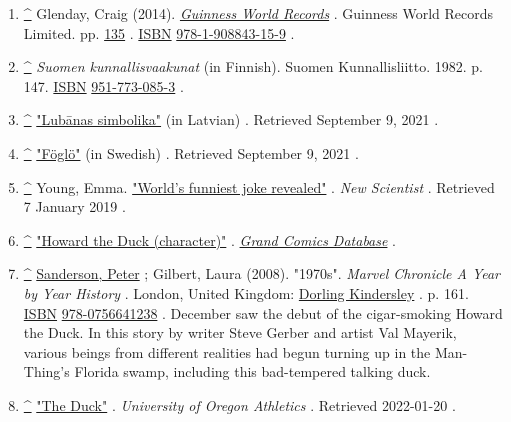 \documentclass[11pt,a4paper]{article}
\begin{document}
\begin{enumerate}
\item \href{\#cite\_ref-48}{\textbf{\textasciicircum{}}} Glenday, Craig (2014). \href{https://archive.org/details/guinnessworldrec0000unse\_r3e7/page/135}{\textit{Guinness World Records}} . Guinness World Records Limited. pp. \href{https://archive.org/details/guinnessworldrec0000unse\_r3e7/page/135}{135} . \href{/wiki/ISBN\_(identifier)}{ISBN} \href{/wiki/Special:BookSources/978-1-908843-15-9}{978-1-908843-15-9} .
\item \href{\#cite\_ref-49}{\textbf{\textasciicircum{}}} \textit{Suomen kunnallisvaakunat} (in Finnish). Suomen Kunnallisliitto. 1982. p. 147. \href{/wiki/ISBN\_(identifier)}{ISBN} \href{/wiki/Special:BookSources/951-773-085-3}{951-773-085-3} .
\item \href{\#cite\_ref-50}{\textbf{\textasciicircum{}}} \href{http://www.lubana.lv/index.php/lv/homepage/lubanas-pilseta-2}{"Lubānas simbolika"} (in Latvian) . Retrieved September 9, 2021 .
\item \href{\#cite\_ref-51}{\textbf{\textasciicircum{}}} \href{http://digi.narc.fi/digi/view.ka?kuid=1738595}{"Föglö"} (in Swedish) . Retrieved September 9, 2021 .
\item \href{\#cite\_ref-52}{\textbf{\textasciicircum{}}} Young, Emma. \href{https://www.newscientist.com/article/dn2876-worlds-funniest-joke-revealed/}{"World's funniest joke revealed"} . \textit{New Scientist} . Retrieved 7 January 2019 .
\item \href{\#cite\_ref-53}{\textbf{\textasciicircum{}}} \href{http://www.comics.org/character/name/Howard\%20the\%20Duck/sort/chrono/}{"Howard the Duck (character)"} . \href{/wiki/Grand\_Comics\_Database}{\textit{Grand Comics Database}} .
\item \href{\#cite\_ref-54}{\textbf{\textasciicircum{}}} \href{/wiki/Peter\_Sanderson}{Sanderson, Peter} ; Gilbert, Laura (2008). "1970s". \textit{Marvel Chronicle A Year by Year History} . London, United Kingdom: \href{/wiki/Dorling\_Kindersley}{Dorling Kindersley} . p. 161. \href{/wiki/ISBN\_(identifier)}{ISBN} \href{/wiki/Special:BookSources/978-0756641238}{978-0756641238} . December saw the debut of the cigar-smoking Howard the Duck. In this story by writer Steve Gerber and artist Val Mayerik, various beings from different realities had begun turning up in the Man-Thing's Florida swamp, including this bad-tempered talking duck.
\item \href{\#cite\_ref-55}{\textbf{\textasciicircum{}}} \href{https://goducks.com/sports/2003/8/28/153778.aspx}{"The Duck"} . \textit{University of Oregon Athletics} . Retrieved 2022-01-20 .
\end{enumerate}
\end{document}
